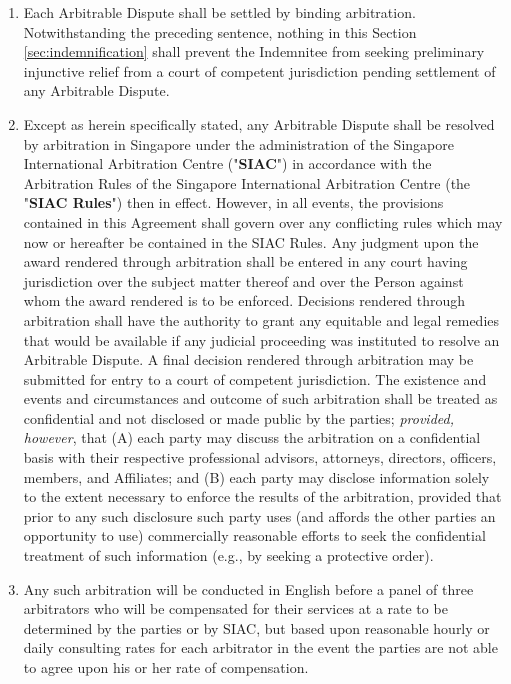 \documentclass{article}
\begin{document}
\begin{enumerate}[label=\Alph*.]
\begin{enumerate}
              \item Each Arbitrable Dispute shall be settled by binding arbitration. Notwithstanding the preceding sentence, nothing in this Section \ref{sec:indemnification} shall prevent the Indemnitee from seeking preliminary injunctive relief from a court of competent jurisdiction pending settlement of any Arbitrable Dispute.

              \item Except as herein specifically stated, any Arbitrable Dispute shall be resolved by arbitration in Singapore under the administration of the Singapore International Arbitration Centre ("\textbf{SIAC}") in accordance with the Arbitration Rules of the Singapore International Arbitration Centre (the "\textbf{SIAC Rules}") then in effect. However, in all events, the provisions contained in this Agreement shall govern over any conflicting rules which may now or hereafter be contained in the SIAC Rules. Any judgment upon the award rendered through arbitration shall be entered in any court having jurisdiction over the subject matter thereof and over the Person against whom the award rendered is to be enforced. Decisions rendered through arbitration shall have the authority to grant any equitable and legal remedies that would be available if any judicial proceeding was instituted to resolve an Arbitrable Dispute. A final decision rendered through arbitration may be submitted for entry to a court of competent jurisdiction. The existence and events and circumstances and outcome of such arbitration shall be treated as confidential and not disclosed or made public by the parties; \textit{provided, however}, that (A) each party may discuss the arbitration on a confidential basis with their respective professional advisors, attorneys, directors, officers, members, and Affiliates; and (B) each party may disclose information solely to the extent necessary to enforce the results of the arbitration, provided that prior to any such disclosure such party uses (and affords the other parties an opportunity to use) commercially reasonable efforts to seek the confidential treatment of such information (e.g., by seeking a protective order).

              \item Any such arbitration will be conducted in English before a panel of three arbitrators who will be compensated for their services at a rate to be determined by the parties or by SIAC, but based upon reasonable hourly or daily consulting rates for each arbitrator in the event the parties are not able to agree upon his or her rate of compensation.


\end{enumerate}
\end{enumerate}
\end{document}
